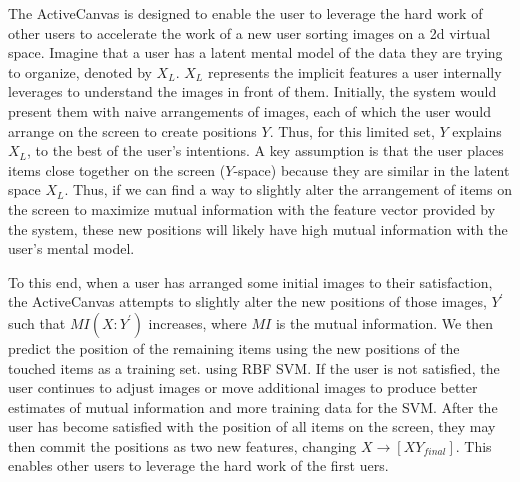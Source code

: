 \documentclass[journal]{vgtc}
\newcommand{\remove}[1]{}
\begin{document}
The ActiveCanvas is designed to enable the user to leverage the hard work of other users to accelerate the work of a new user sorting images on a 2d virtual space.  Imagine that a user has a latent mental model of the data they are trying to organize, denoted by $X_L$. $X_L$ represents the implicit features a user internally leverages to understand the images in front of them. Initially, the system would present them with naive arrangements of images, each of which the user would arrange on the screen to create positions $Y$.  Thus, for this limited set, $Y$ explains $X_L$, to the best of the user's intentions. \remove{Information theoretic measures are promising objective functions to evaluate this explanatory power, although they are by no means the only tool at our disposal. Information theoretic methods are often invariant to invertible transformations, so the user doesn't need to generate a model for converting $X_L$ into $Y$ nor does the system need to know this mapping to optimize mutual information.} A key assumption is that the user places items close together on the screen ($Y$-space) because they are similar in the latent space $X_L$.  Thus, if we can find a way to slightly alter the arrangement of items on the screen to maximize mutual information with the feature vector provided by the system, these new positions will likely have high mutual information with the user's mental model.  \remove{That is, the new arrangement of items on the screen explains the user's mental model, and the user's mental model explains the arrangement on the screen.}


To this end, when a user has arranged some initial images to their satisfaction, the ActiveCanvas attempts to slightly alter the new positions of those images, $Y^\prime$ such that $MI(X:Y^\prime)$ increases, where $MI$ is the mutual information. We then predict the position of the remaining items using the new positions of the touched items as a training set. using RBF SVM.  If the user is not satisfied, the user continues to adjust images or move additional images to produce better estimates of mutual information and more training data for the SVM. After the user has become satisfied with the position of all items on the screen, they may then commit the positions as two new features, changing $X \rightarrow [X Y_{final}]$. This enables other users to leverage the hard work of the first uers.
\remove{
Both strategies rely on ActiveCanvas being provided feature-vectors for each item that can capture the user's mental model. If, as an extreme example, the feature-vectors are merely randomly generated numbers with no meaningful relation to the underlying content, no system will be able to aide a user, as it will have no information.  The user would be forced to interact with every item of interest.  More realistically, the user should assume that the underlying feature set is good, but not sufficient, for capturing the desired criteria.\footnote{For example,  text is frequently analyzed as a ``bag-of-words," disregarding the word order. This means the system can easily capture the difference between ``My dog ate the food" and ``My cat ate the food," but it can not distinguish between ``my dog ate my cat" and ``my cat ate my dog."} 
}
\end{document}
